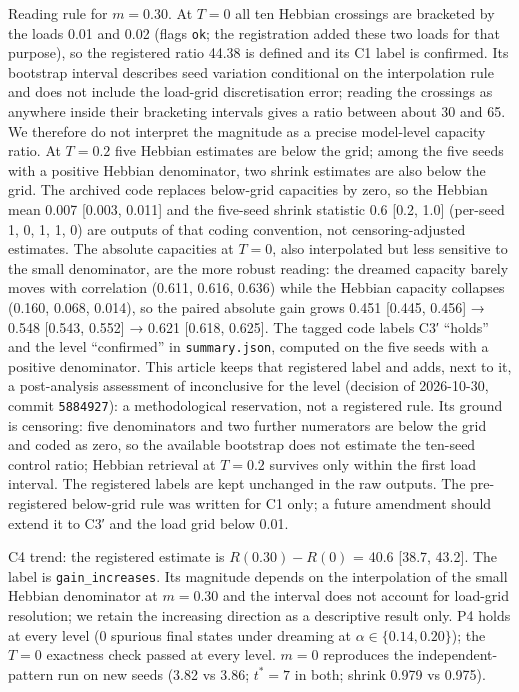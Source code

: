 Reading rule for \(m = 0.30\). At \(T = 0\) all ten Hebbian crossings
are bracketed by the loads 0.01 and 0.02 (flags \texttt{ok}; the
registration added these two loads for that purpose), so the registered
ratio 44.38 is defined and its C1 label is confirmed. Its bootstrap
interval describes seed variation conditional on the interpolation rule
and does not include the load-grid discretisation error; reading the
crossings as anywhere inside their bracketing intervals gives a ratio
between about 30 and 65. We therefore do not interpret the magnitude as
a precise model-level capacity ratio. At \(T = 0.2\) five Hebbian
estimates are below the grid; among the five seeds with a positive
Hebbian denominator, two shrink estimates are also below the grid. The
archived code replaces below-grid capacities by zero, so the Hebbian
mean 0.007 {[}0.003, 0.011{]} and the five-seed shrink statistic 0.6
{[}0.2, 1.0{]} (per-seed 1, 0, 1, 1, 0) are outputs of that coding
convention, not censoring-adjusted estimates. The absolute capacities at
\(T = 0\), also interpolated but less sensitive to the small
denominator, are the more robust reading: the dreamed capacity barely
moves with correlation (0.611, 0.616, 0.636) while the Hebbian capacity
collapses (0.160, 0.068, 0.014), so the paired absolute gain grows 0.451
{[}0.445, 0.456{]} → 0.548 {[}0.543, 0.552{]} → 0.621 {[}0.618,
0.625{]}. The tagged code labels C3′ ``holds'' and the level
``confirmed'' in \texttt{summary.json}, computed on the five seeds with
a positive denominator. This article keeps that registered label and
adds, next to it, a post-analysis assessment of inconclusive for the
level (decision of 2026-10-30, commit \texttt{5884927}): a
methodological reservation, not a registered rule. Its ground is
censoring: five denominators and two further numerators are below the
grid and coded as zero, so the available bootstrap does not estimate the
ten-seed control ratio; Hebbian retrieval at \(T = 0.2\) survives only
within the first load interval. The registered labels are kept unchanged
in the raw outputs. The pre-registered below-grid rule was written for
C1 only; a future amendment should extend it to C3′ and the load grid
below 0.01.

C4 trend: the registered estimate is \(R(0.30) - R(0)\) = 40.6 {[}38.7,
43.2{]}. The label is \texttt{gain\_increases}. Its magnitude depends on
the interpolation of the small Hebbian denominator at \(m = 0.30\) and
the interval does not account for load-grid resolution; we retain the
increasing direction as a descriptive result only. P4 holds at every
level (0 spurious final states under dreaming at
\(\alpha \in \{0.14, 0.20\}\)); the \(T = 0\) exactness check passed at
every level. \(m = 0\) reproduces the independent- pattern run on new
seeds (3.82 vs 3.86; \(t^* = 7\) in both; shrink 0.979 vs 0.975).

